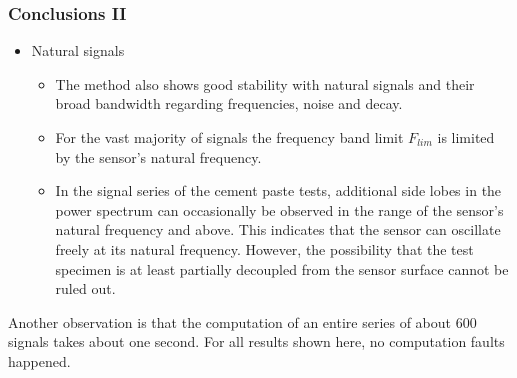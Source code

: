 \documentclass[11pt,aspectratio=169]{beamer}
\begin{document}
		\begin{frame}
		\frametitle{Conclusions II}
		\begin{itemize}
			\item \parbox{50mm}{\textcolor{RIPtitlecol}{Natural signals}}
			\begin{itemize}
				\item The method also shows good stability with natural signals and their broad bandwidth regarding frequencies, noise and decay.
				\item For the vast majority of signals the frequency band limit $F_{lim}$ is limited by the sensor's natural frequency.
				\item In the signal series of the cement paste tests, additional side lobes in the power spectrum can occasionally be observed in the range of the sensor's natural frequency and above. This indicates that the sensor can oscillate freely at its natural frequency. However, the possibility that the test specimen is at least partially decoupled from the sensor surface cannot be ruled out.
			\end{itemize}
		\end{itemize}
		Another observation is that the computation of an entire series of about 600 signals takes about one second. For all results shown here, no computation faults happened.
	\end{frame}
\end{document}
